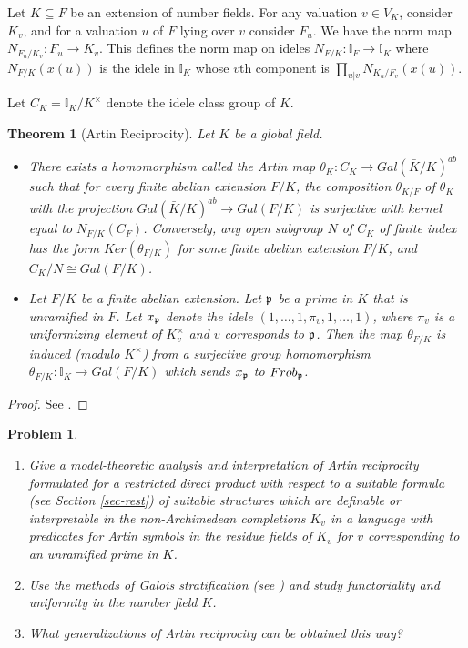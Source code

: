 \documentclass[12pt]{amsart}
\def\I{\mathbb{I}}
\newtheorem{thm}{Theorem}[section]
\numberwithin{equation}{section}
\newtheorem{prob}{Problem}[section]
\begin{document}
Let $K\subseteq F$ be an extension of number fields. For any valuation $v\in V_K$, consider $K_v$, and for a valuation $u$ of $F$ lying over $v$ consider $F_u$. We have the norm map $N_{F_u/K_v}:F_u\rightarrow K_v$. This defines the norm map 
on ideles $N_{F/K}: \I_F\rightarrow \I_K$ where $N_{F/K}(x(u))$ is the idele in $\I_K$ whose $v$th component is 
$\prod_{u|v}N_{K_u/F_v}(x(u))$. 

Let $C_K=\I_K/K^{\times}$ denote the idele class group of $K$.
\begin{thm}[Artin Reciprocity] Let $K$ be a global field.
\begin{itemize}
\item There exists a homomorphism called the Artin map $\theta_K: C_K \rightarrow Gal(\bar{K}/K)^{ab}$ such that 
for every finite abelian extension $F/K$, the composition $\theta_{K/F}$ of $\theta_K$ with the projection 
$Gal(\bar{K}/K)^{ab}\rightarrow Gal(F/K)$ is surjective with kernel equal to $N_{F/K}(C_F)$. Conversely, 
any open subgroup $N$ of $C_K$ of finite index has the form $Ker(\theta_{F/K})$ for some finite abelian extension 
$F/K$, and $C_K/N\cong Gal(F/K)$.
\item Let $F/K$ be a finite abelian extension. Let $\frak p$ be a prime in $K$ that is unramified in $F$. Let $x_{\frak p}$ denote the idele $(1,\dots,1,\pi_v,1,\dots,1)$, where $\pi_v$ is a uniformizing element of $K_v^{\times}$ and $v$ corresponds to 
$\frak p$. 
Then the map $\theta_{F/K}$ is induced (modulo $K^{\times}$) from a surjective group homomorphism $\theta_{F/K}:\I_K\rightarrow Gal(F/K)$ which sends $x_{\frak p}$ to $Frob_{\frak p}$. 
\end{itemize}
\end{thm}
\begin{proof} See \cite{ramak}.
\end{proof}
\begin{prob} \noindent \begin{enumerate}
\item Give a model-theoretic analysis and interpretation of Artin reciprocity formulated for a restricted direct product with respect to a suitable formula (see Section \ref{sec-rest}) 
of suitable structures which are definable or interpretable in the non-Archimedean completions 
$K_v$ in a language with predicates for Artin symbols in the residue fields of $K_v$ for $v$ corresponding to an unramified prime in $K$. 
\item Use the methods of Galois stratification (see \cite{FJ}) and study functoriality and uniformity in the number field $K$. 
\item What generalizations of Artin reciprocity can be obtained this way?
\end{enumerate}
\end{prob}
 
\end{document}
